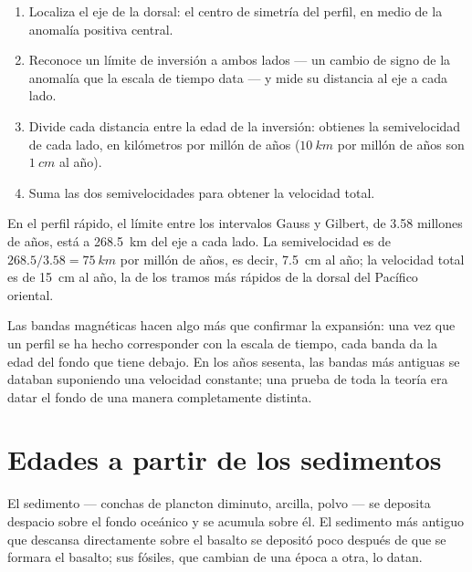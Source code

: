 
\begin{method}\label{met:g11:drift-to-spreading:rate}
\begin{enumerate}
  \item Localiza el eje de la dorsal: el centro de simetría del perfil, en
        medio de la anomalía positiva central.
  \item Reconoce un límite de inversión a ambos lados --- un cambio de signo
        de la anomalía que la escala de tiempo data --- y mide su distancia
        al eje a cada lado.
  \item Divide cada distancia entre la edad de la inversión: obtienes la
        semivelocidad de cada lado, en kilómetros por millón de años
        ($\qty{10}{km}$ por millón de años son $\qty{1}{cm}$ al año).
  \item Suma las dos semivelocidades para obtener la velocidad total.
\end{enumerate}
\end{method}

\begin{example}\label{ex:g11:drift-to-spreading:fast}
En el perfil rápido, el límite entre los intervalos Gauss y Gilbert, de
\num{3.58} millones de años, está a \qty{268.5}{km} del eje a cada lado. La
semivelocidad es de $268.5/3.58 = \qty{75}{km}$ por millón de años, es decir,
\qty{7.5}{cm} al año; la velocidad total es de \qty{15}{cm} al año, la de los
tramos más rápidos de la dorsal del Pacífico oriental.
\end{example}

Las bandas magnéticas hacen algo más que confirmar la expansión: una vez que
un perfil se ha hecho corresponder con la escala de tiempo, cada banda da la
edad del fondo que tiene debajo. En los años sesenta, las bandas más antiguas
se databan suponiendo una velocidad constante; una prueba de toda la teoría
era datar el fondo de una manera completamente distinta.

\section{Edades a partir de los sedimentos}

El sedimento --- conchas de plancton diminuto, arcilla, polvo --- se deposita
despacio sobre el fondo oceánico y se acumula sobre él. El sedimento más
antiguo que descansa directamente sobre el basalto se depositó poco después
de que se formara el basalto; sus fósiles, que cambian de una época a otra,
lo datan.

